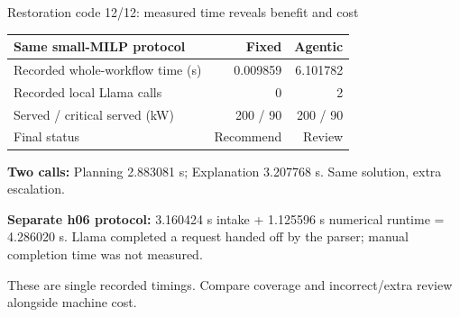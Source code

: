 \begin{frame}[t]{Restoration code 12/12: measured time reveals benefit and cost}
\deepdive
{}
\footnotesize
\begin{tabular}{@{}>{\raggedright\arraybackslash}p{.54\linewidth}rr@{}}
\toprule Same small-MILP protocol & Fixed & Agentic \\
\midrule
Recorded whole-workflow time (s) & 0.009859 & 6.101782 \\
Recorded local Llama calls & 0 & 2 \\
Served / critical served (kW) & 200 / 90 & 200 / 90 \\
Final status & Recommend & Review \\
\bottomrule
\end{tabular}
\par\smallskip\textbf{Two calls:} Planning 2.883081 s; Explanation 3.207768 s. Same solution, extra escalation.
\par\smallskip\textbf{Separate h06 protocol:} 3.160424 s intake + 1.125596 s numerical runtime = 4.286020 s. Llama completed a request handed off by the parser; manual completion time was not measured.
\par\smallskip These are single recorded timings. Compare coverage and incorrect/extra review alongside machine cost.
\end{frame}
\endgroup
